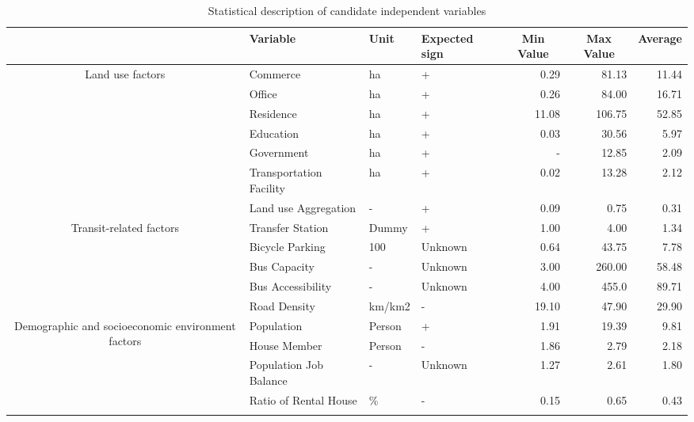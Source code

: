 \begin{sidewaystable}[htbp] %
	\centering
	\caption{Statistical description of candidate independent variables}
	\label{tab:chp2:StatisticalDescription} %
	\small
	\renewcommand{\arraystretch}{1.25} %
	
	\begin{tabular}{clllrrr}
		\Xhline{1.5pt}
		
		\multicolumn{1}{c}{Category} & %
		\multicolumn{1}{l}{Variable} &
		\multicolumn{1}{l}{Unit} &
		\multicolumn{1}{l}{Expected sign} &
		\multicolumn{1}{c}{Min Value} &	
		\multicolumn{1}{c}{Max Value} &	
		\multicolumn{1}{c}{Average}\\
		\midrule
		
		\multirow{7}{90pt}{\centering Land use factors} %
		& Commerce & ha & + & 0.29 & 81.13 & 11.44 \\
		& Office & ha & + & 0.26  & 84.00 & 16.71 \\
		& Residence & ha & + & 11.08 & 106.75 & 52.85 \\
		& Education & ha & + & 0.03 & 30.56 & 5.97 \\
		& Government & ha & + & - & 12.85 & 2.09 \\
		& Transportation Facility & ha & + & 0.02 & 13.28 & 2.12 \\
		& Land use Aggregation & - & + & 0.09 & 0.75 & 0.31 \\
		\cmidrule{2-7} 		%
		
		\multirow{5}{90pt}{\centering Transit-related factors}
		& Transfer Station & Dummy & + & 1.00 & 4.00 & 1.34 \\
		& Bicycle Parking & 100 & Unknown & 0.64 & 43.75 & 7.78 \\
		& Bus Capacity & - & Unknown & 3.00 & 260.00 & 58.48 \\
		& Bus Accessibility & - & Unknown & 4.00 & 455.0 & 89.71 \\
		& Road Density & km/km2 & - & 19.10 & 47.90 & 29.90 \\
		\cmidrule{2-7}
		
		\multirow{4}{90pt}{\centering Demographic and socioeconomic environment factors} 
		& Population & Person & + & 1.91 & 19.39 & 9.81 \\
		& House Member & Person & - & 1.86 & 2.79 & 2.18 \\
		& Population Job Balance & - & Unknown & 1.27 & 2.61 & 1.80 \\
		& Ratio of Rental House & \% & - & 0.15 & 0.65 & 0.43 \\
		\Xhline{1.5pt}
	\end{tabular}
\end{sidewaystable}


